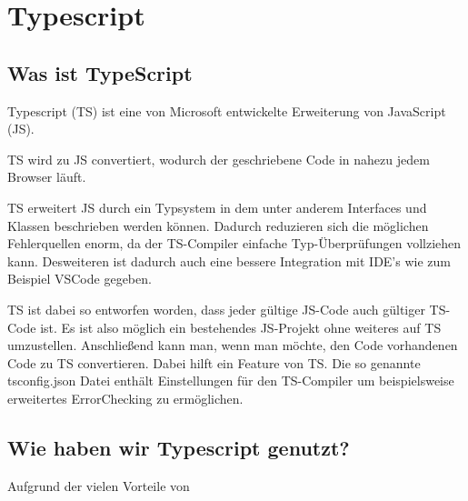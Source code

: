 \section{Typescript}

\subsection{Was ist TypeScript}

Typescript (TS) ist eine von Microsoft entwickelte Erweiterung von JavaScript (JS). \cite{typescript}

TS wird zu JS convertiert, wodurch der geschriebene Code in nahezu jedem Browser läuft. \cite{typescript}

TS erweitert JS durch ein Typsystem in dem unter anderem Interfaces und Klassen beschrieben werden können. Dadurch reduzieren sich die möglichen Fehlerquellen enorm, da der TS-Compiler einfache Typ-Überprüfungen vollziehen kann. Desweiteren ist dadurch auch eine bessere Integration mit IDE's wie zum Beispiel VSCode gegeben. \cite{typescript}

TS ist dabei so entworfen worden, dass jeder gültige JS-Code auch gültiger TS-Code ist. Es ist also möglich ein bestehendes JS-Projekt ohne weiteres auf TS umzustellen. Anschließend kann man, wenn man möchte, den Code vorhandenen Code zu TS convertieren. \cite{typescript} \cite{ts-doku} Dabei hilft ein Feature von TS. Die so genannte tsconfig.json Datei enthält Einstellungen für den TS-Compiler um beispielsweise erweitertes ErrorChecking zu ermöglichen. \cite{tsconfig}

\subsection{Wie haben wir Typescript genutzt?}

Aufgrund der vielen Vorteile von 
